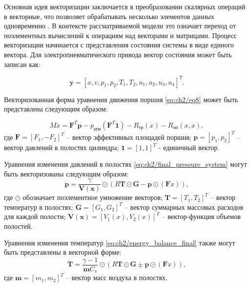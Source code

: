 Основная идея векторизации заключается в преобразовании скалярных операций в
векторные, что позволяет обрабатывать несколько элементов данных
одновременно \cite*{nuzman2011vaporsimd}. В контексте рассматриваемой модели это означает переход от
поэлементных вычислений к операциям над векторами и матрицами.
Процесс векторизации начинается с представления состояния системы
в виде единого вектора. Для электропневматического привода
вектор состояния может быть записан как:

\begin{equation}\label{eq:ch2/state_vector}
    \mathbf{y} = [x, v, p_1, p_2, T_1, T_2, u_1, u_2, u_3, u_4]^T.
\end{equation}

Векторизованная форма уравнения движения поршня \eqref{eq:ch2/eq8} может быть представлена следующим образом:

\begin{equation}\label{eq:ch2/vec_motion}
    M\ddot{x} = \mathbf{F}^T\mathbf{p} - p_\text{атм}(\mathbf{F}^T\mathbf{1}) - R_\text{тр}(\dot{x}) - R_\text{оп}(x, \dot{x}),
\end{equation}
где $\mathbf{F} = [F_1, -F_2]^T$ -- вектор эффективных площадей поршня;
$\mathbf{p} = [p_1, p_2]^T$ -- вектор давлений в полостях цилиндра;
$\mathbf{1} = [1, 1]^T$ - единичный вектор.

Уравнения изменения давлений в полостях \eqref{eq:ch2/final_pressure_system} могут быть векторизованы следующим образом:
\begin{equation}\label{eq:ch2/vec_pressure}
    \dot{\mathbf{p}} = \frac{\gamma}{\mathbf{V}(\mathbf{x})} \odot (R\mathbf{T} \odot \mathbf{G} - \mathbf{p} \odot (\mathbf{F}\dot{x})),
\end{equation}
где $\odot$ обозначает поэлементное умножение векторов;
$\mathbf{T} = [T_1, T_2]^T$ -- вектор температур в полостях;
$\mathbf{G} = [G_1, G_2]^T$ -- вектор суммарных массовых расходов для каждой полости;
$\mathbf{V}(\mathbf{x}) = [V_1(x), V_2(x)]^T$ -- вектор-функция объемов полостей.

Уравнения изменения температур \eqref{eq:ch2/energy_balance_final} также могут быть представлены в векторной форме:
\begin{equation}\label{eq:ch2/vec_temperature}
    \dot{\mathbf{T}} = \frac{\gamma-1}{\mathbf{m}C_v} \odot (R\mathbf{T} \odot \mathbf{G} \pm \mathbf{p} \odot (\mathbf{F}\dot{x})),
\end{equation}
где $\mathbf{m} = [m_1, m_2]^T$ -- вектор масс воздуха в полостях.


